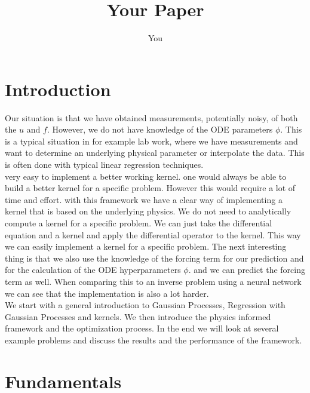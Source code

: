 \documentclass{article}
\title{Your Paper}
\author{You}
\begin{document}
\maketitle

\newpage
\begin{abstract}

\end{abstract}

\section{Introduction}
Our situation is that we have obtained measurements, potentially noisy, of both
the $u$ and $f$. However, we do not have knowledge of the ODE parameters
$\phi$. This is a typical situation in for example lab work, where we have
measurements and want to determine an underlying physical parameter or
interpolate the data. This is often done with typical linear regression
techniques.\\ very easy to implement a better working kernel. one would always be able to build a better kernel for a specific problem. However this would require a lot of time and effort. with this framework we have a clear way of implementing a kernel that is based on the underlying physics. We do not need to analytically compute a kernel for a specific problem. We can just take the differential equation and a kernel and apply the differential operator to the kernel. This way we can easily implement a kernel for a specific problem. The next interesting thing is that we also use the knowledge of the forcing term for our prediction and for the calculation of the ODE hyperparameters $\phi$. and we can predict the forcing term as well. When comparing this to an inverse problem using a neural network we can see that the implementation is also a lot harder.\\
We start with a general introduction to Gaussian Processes, Regression with Gaussian Processes and kernels. We
then introduce the physics informed framework and the optimization process. In the end we will look at several example problems and discuss the results and the performance of the framework.\\

\section{Fundamentals}
\end{document}
